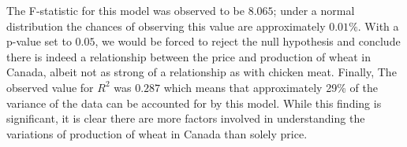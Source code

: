The F-statistic for this model was observed to be $8.065$; under a normal distribution the chances of observing this value are approximately $0.01\%$.
With a p-value set to $0.05$, we would be forced to reject the null hypothesis and conclude there is indeed a relationship between the price and production of wheat in Canada, albeit not as strong of a relationship as with chicken meat.
Finally, The observed value for $R^2$ was $0.287$ which means that approximately 29\% of the variance of the data can be accounted for by this model.
While this finding is significant, it is clear there are more factors involved in understanding the variations of production of wheat in Canada than solely price.


